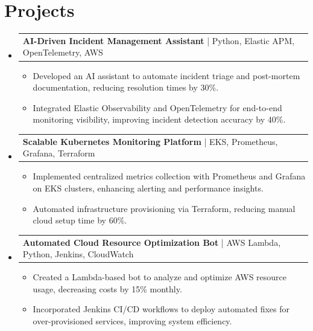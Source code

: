 \documentclass[letterpaper,11pt]{article}
\makeatletter
\newcommand{\resumeItem}[1]{
  \item\footnotesize{
    {#1 \vspace{-2pt}}
  }
}
\newcommand{\resumeProjectHeading}[2]{
    \item
    \begin{tabular*}{1.001\textwidth}{l@{\extracolsep{\fill}}r}
      \small#1 & \textbf{\small #2}\\
    \end{tabular*}\vspace{-7pt}
}
\newcommand{\resumeSubHeadingListStart}{\begin{itemize}[leftmargin=0pt, label={}]}
\newcommand{\resumeSubHeadingListEnd}{\end{itemize}}
\newcommand{\resumeItemListStart}{\begin{itemize}[leftmargin=*]}
\newcommand{\resumeItemListEnd}{\end{itemize}\vspace{-5pt}}
\makeatother
\begin{document}
\section{Projects}
    \vspace{-5pt}
    \resumeSubHeadingListStart
          \resumeProjectHeading
              {\textbf{AI-Driven Incident Management Assistant} | Python, Elastic APM, OpenTelemetry, AWS}{}
        \resumeItemListStart
            \resumeItem{Developed an AI assistant to automate incident triage and post-mortem documentation, reducing resolution times by 30\%.}
            \resumeItem{Integrated Elastic Observability and OpenTelemetry for end-to-end monitoring visibility, improving incident detection accuracy by 40\%.}
        \resumeItemListEnd
        \vspace{-12pt}
    
    \resumeProjectHeading
        {\textbf{Scalable Kubernetes Monitoring Platform} | EKS, Prometheus, Grafana, Terraform}{}
        \resumeItemListStart
            \resumeItem{Implemented centralized metrics collection with Prometheus and Grafana on EKS clusters, enhancing alerting and performance insights.}
            \resumeItem{Automated infrastructure provisioning via Terraform, reducing manual cloud setup time by 60\%.}
        \resumeItemListEnd
          \vspace{-12pt}
      \resumeProjectHeading
          {\textbf{Automated Cloud Resource Optimization Bot} | AWS Lambda, Python, Jenkins, CloudWatch}{}
          \resumeItemListStart
              \resumeItem{Created a Lambda-based bot to analyze and optimize AWS resource usage, decreasing costs by 15\% monthly.}
              \resumeItem{Incorporated Jenkins CI/CD workflows to deploy automated fixes for over-provisioned services, improving system efficiency.}
          \resumeItemListEnd 
    \resumeSubHeadingListEnd
\end{document}
